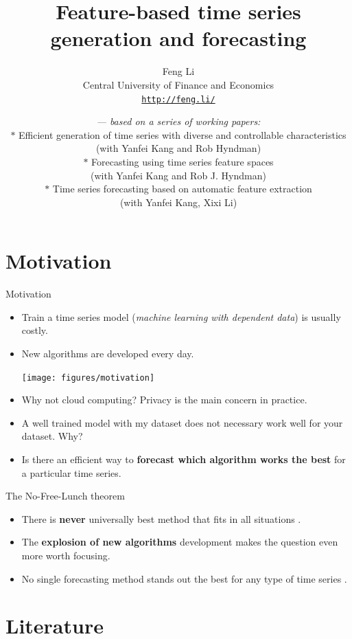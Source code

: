 \documentclass[11pt,ignorenonframetext,compress]{beamer}
\institute{}
\title{Feature-based time series generation and forecasting}
\subtitle{Feng Li\\ Central University of Finance and Economics\\\texttt{\url{http://feng.li/}}}
\author{{\em --- based on a series of working papers:}\\ {\footnotesize
    $\ast$  {\color{blue} Efficient generation of time series with diverse and controllable characteristics}\\
    (with Yanfei Kang and Rob Hyndman)\\
    $\ast$ {\color{blue} Forecasting using time series feature spaces}\\
     (with Yanfei Kang and Rob J. Hyndman)\\
    $\ast$ {\color{blue} Time series forecasting based on automatic feature extraction}\\
     (with Yanfei Kang,  Xixi Li)}}
\date{}
\begin{document}
\frame{\titlepage}

\section{Motivation}\label{motivation}

\begin{frame}{Motivation}

  \begin{itemize}
  \item Train a time series model (\emph{machine learning with dependent data}) is usually
    costly.

  \item New algorithms are developed every day.

  \centerline{\texttt{[image: figures/motivation]}}


  \item Why not cloud computing? Privacy is the main concern in practice.

  \item A well trained model with my dataset does not necessary work well for your dataset. Why?

  \item Is there an efficient way to \textbf{forecast which algorithm works the best} for
    a particular time series.

  \end{itemize}


\end{frame}

\begin{frame}{The No-Free-Lunch theorem}

  \begin{itemize}
  \item
    There is \textbf{never} universally best method that fits in all situations
    \citep{wolpert1996lack}.
  \item
    The \textbf{explosion of new algorithms} development makes the question even
    more worth focusing.
  \item
    No single forecasting method stands out the best for any type of time
    series \citep{adam1973individual}.
  \end{itemize}


\end{frame}

\section{Literature}\label{literature}
\end{document}
